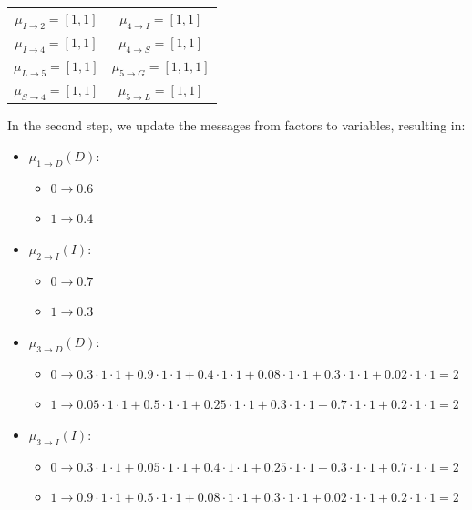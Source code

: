 \begin{example}
\begin{table}[H]
\begin{tabular}{|cc|}
        $\mu_{I \rightarrow 2}=[1,1]$ & $\mu_{4 \rightarrow I}=[1,1]$   \\
        $\mu_{I \rightarrow 4}=[1,1]$ & $\mu_{4 \rightarrow S}=[1,1]$   \\
        $\mu_{L \rightarrow 5}=[1,1]$ & $\mu_{5 \rightarrow G}=[1,1,1]$ \\
        $\mu_{S \rightarrow 4}=[1,1]$ & $\mu_{5 \rightarrow L}=[1,1]$   \\ \hline
        \end{tabular}
    \end{table}
    In the second step, we update the messages from factors to variables, resulting in:
    \begin{itemize}
        \item $\mu_{1 \rightarrow D}(D)$:
            \begin{itemize}
                \item $0 \rightarrow 0.6$
                \item $1 \rightarrow 0.4$
            \end{itemize}
        \item $\mu_{2 \rightarrow I}(I)$:
            \begin{itemize}
                \item $0 \rightarrow 0.7$
                \item $1 \rightarrow 0.3$
            \end{itemize}
        \item $\mu_{3 \rightarrow D}(D)$:
            \begin{itemize}
                \item $0 \rightarrow 0.3 \cdot 1 \cdot 1 + 0.9 \cdot 1 \cdot 1 + 0.4 \cdot 1 \cdot 1 + 0.08 \cdot 1 \cdot 1 + 0.3 \cdot 1 \cdot 1 + 0.02 \cdot 1 \cdot 1 = 2$
                \item $1 \rightarrow 0.05 \cdot 1 \cdot 1 + 0.5 \cdot 1 \cdot 1 + 0.25 \cdot 1 \cdot 1 + 0.3 \cdot 1 \cdot 1 + 0.7 \cdot 1 \cdot 1 + 0.2 \cdot 1 \cdot 1 = 2$
            \end{itemize}
        \item $\mu_{3 \rightarrow I}(I)$:
            \begin{itemize}
                \item $0 \rightarrow 0.3 \cdot 1 \cdot 1 + 0.05 \cdot 1 \cdot 1 + 0.4 \cdot 1 \cdot 1 + 0.25 \cdot 1 \cdot 1 + 0.3 \cdot 1 \cdot 1 + 0.7 \cdot 1 \cdot 1 =2$
                \item $1 \rightarrow 0.9 \cdot 1 \cdot 1 + 0.5 \cdot 1 \cdot 1 + 0.08 \cdot 1 \cdot 1 + 0.3 \cdot 1 \cdot 1 + 0.02 \cdot 1 \cdot 1 + 0.2 \cdot 1 \cdot 1 = 2$

\end{itemize}
\end{itemize}
\end{example}

